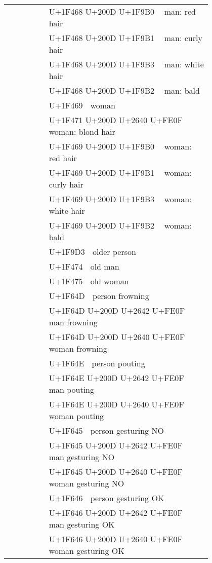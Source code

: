 \documentclass[a4paper,12pt]{article}
\newcommand{\fontA}[1]{{\fontspec[RawFeature={dist,ccmp}]{Segoe UI Emoji} #1}}
\newcommand{\fontB}[1]{{\fontspec[Ligatures=Common,RawFeature={+ccmp}]{Symbola_Hinted.ttf} #1}}
\begin{document}
\begin{longtable}[c]{ccp{0.8\linewidth}}
\fontA{👨‍🦰}&\fontB{👨‍🦰}&U+1F468 U+200D U+1F9B0 👨‍🦰 man: red hair\\
\fontA{👨‍🦱}&\fontB{👨‍🦱}&U+1F468 U+200D U+1F9B1 👨‍🦱 man: curly hair\\
\fontA{👨‍🦳}&\fontB{👨‍🦳}&U+1F468 U+200D U+1F9B3 👨‍🦳 man: white hair\\
\fontA{👨‍🦲}&\fontB{👨‍🦲}&U+1F468 U+200D U+1F9B2 👨‍🦲 man: bald\\
\fontA{👩}&\fontB{👩}&U+1F469 👩 woman\\
\fontA{👱‍♀️}&\fontB{👱‍♀️}&U+1F471 U+200D U+2640 U+FE0F 👱‍♀️ woman: blond hair\\
\fontA{👩‍🦰}&\fontB{👩‍🦰}&U+1F469 U+200D U+1F9B0 👩‍🦰 woman: red hair\\
\fontA{👩‍🦱}&\fontB{👩‍🦱}&U+1F469 U+200D U+1F9B1 👩‍🦱 woman: curly hair\\
\fontA{👩‍🦳}&\fontB{👩‍🦳}&U+1F469 U+200D U+1F9B3 👩‍🦳 woman: white hair\\
\fontA{👩‍🦲}&\fontB{👩‍🦲}&U+1F469 U+200D U+1F9B2 👩‍🦲 woman: bald\\
\fontA{🧓}&\fontB{🧓}&U+1F9D3 🧓 older person\\
\fontA{👴}&\fontB{👴}&U+1F474 👴 old man\\
\fontA{👵}&\fontB{👵}&U+1F475 👵 old woman\\
\fontA{🙍}&\fontB{🙍}&U+1F64D 🙍 person frowning\\
\fontA{🙍‍♂️}&\fontB{🙍‍♂️}&U+1F64D U+200D U+2642 U+FE0F 🙍‍♂️ man frowning\\
\fontA{🙍‍♀️}&\fontB{🙍‍♀️}&U+1F64D U+200D U+2640 U+FE0F 🙍‍♀️ woman frowning\\
\fontA{🙎}&\fontB{🙎}&U+1F64E 🙎 person pouting\\
\fontA{🙎‍♂️}&\fontB{🙎‍♂️}&U+1F64E U+200D U+2642 U+FE0F 🙎‍♂️ man pouting\\
\fontA{🙎‍♀️}&\fontB{🙎‍♀️}&U+1F64E U+200D U+2640 U+FE0F 🙎‍♀️ woman pouting\\
\fontA{🙅}&\fontB{🙅}&U+1F645 🙅 person gesturing NO\\
\fontA{🙅‍♂️}&\fontB{🙅‍♂️}&U+1F645 U+200D U+2642 U+FE0F 🙅‍♂️ man gesturing NO\\
\fontA{🙅‍♀️}&\fontB{🙅‍♀️}&U+1F645 U+200D U+2640 U+FE0F 🙅‍♀️ woman gesturing NO\\
\fontA{🙆}&\fontB{🙆}&U+1F646 🙆 person gesturing OK\\
\fontA{🙆‍♂️}&\fontB{🙆‍♂️}&U+1F646 U+200D U+2642 U+FE0F 🙆‍♂️ man gesturing OK\\
\fontA{🙆‍♀️}&\fontB{🙆‍♀️}&U+1F646 U+200D U+2640 U+FE0F 🙆‍♀️ woman gesturing OK\\

\end{longtable}
\end{document}
